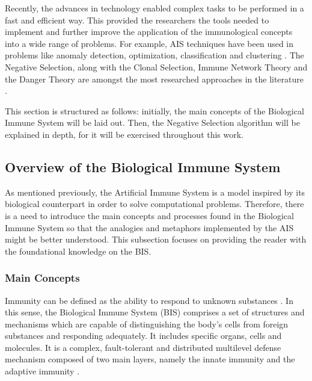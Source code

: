 Recently, the advances in technology enabled complex tasks to be performed in a fast and efficient way. This provided the researchers the tools needed to implement and further improve the application of the immunological concepts into a wide range of problems. For example, AIS techniques have been used in problems like anomaly detection, optimization, classification and clustering \cite{AISSOA2015}. The Negative Selection, along with the Clonal Selection, Immune Network Theory and the Danger Theory are amongst the most researched approaches in the literature \cite{NSAResearch2021}.

This section is structured as follows: initially, the main concepts of the Biological Immune System will be laid out. Then, the Negative Selection algorithm will be explained in depth, for it will be exercised throughout this work.

\subsection{Overview of the Biological Immune System} \label{sec:bgBISOverview}

As mentioned previously, the Artificial Immune System is a model inspired by its biological counterpart in order to solve computational problems. Therefore, there is a need to introduce the main concepts and processes found in the Biological Immune System so that the analogies and metaphors implemented by the AIS might be better understood. This subsection focuses on providing the reader with the foundational knowledge on the BIS. 

\subsubsection{Main Concepts}

Immunity can be defined as the ability to respond to unknown substances \cite{ICBook2009}. In this sense, the Biological Immune System (BIS) comprises a set of structures and mechanisms which are capable of distinguishing the body's cells from foreign substances and responding adequately. It includes specific organs, cells and molecules. It is a complex, fault-tolerant and distributed multilevel defense mechanism composed of two main layers, namely the innate immunity and the adaptive immunity \cite{Kuby2019}. 


